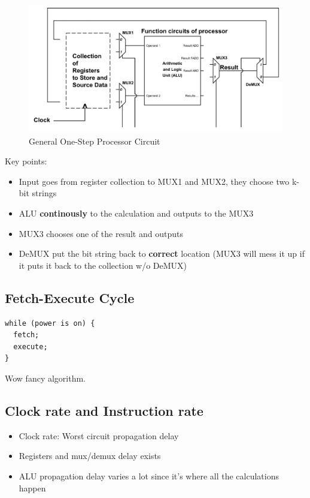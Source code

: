 \documentclass[11pt]{article}
\begin{document}
\begin{figure}[htbp]
\centering
\includegraphics[width=.9\linewidth]{./img/general_one_step_processor_circuit.jpg}
\caption{\label{fig:orgd9ca102}General One-Step Processor Circuit}
\end{figure}

Key points:
\begin{itemize}
\item Input goes from register collection to MUX1 and MUX2, they choose two k-bit strings
\item ALU \textbf{continously} to the calculation and outputs to the MUX3
\item MUX3 chooses one of the result and outputs
\item DeMUX put the bit string back to \textbf{correct} location (MUX3 will mess it up if it puts it back to the collection w/o DeMUX)
\end{itemize}

\subsection{Fetch-Execute Cycle}
\label{sec:org0c714f7}

\begin{verbatim}
while (power is on) {
  fetch;
  execute;
}
\end{verbatim}

Wow fancy algorithm.

\subsection{Clock rate and Instruction rate}
\label{sec:orgd6b9939}

\begin{itemize}
\item Clock rate: Worst circuit propagation delay
\item Registers and mux/demux delay exists
\item ALU propagation delay varies a lot since it's where all the calculations happen
\end{itemize}
\end{document}
